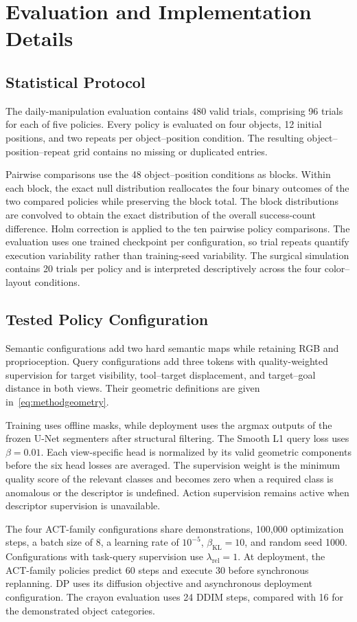 \section{Evaluation and Implementation Details}
\label{app:evalaudit}

\subsection{Statistical Protocol}
The daily-manipulation evaluation contains 480 valid trials, comprising 96 trials for each of five policies.
Every policy is evaluated on four objects, 12 initial positions, and two repeats per object--position condition.
The resulting object--position--repeat grid contains no missing or duplicated entries.

Pairwise comparisons use the 48 object--position conditions as blocks.
Within each block, the exact null distribution reallocates the four binary outcomes of the two compared policies while preserving the block total.
The block distributions are convolved to obtain the exact distribution of the overall success-count difference.
Holm correction is applied to the ten pairwise policy comparisons.
The evaluation uses one trained checkpoint per configuration, so trial repeats quantify execution variability rather than training-seed variability.
The surgical simulation contains 20 trials per policy and is interpreted descriptively across the four color--layout conditions.

\subsection{Tested Policy Configuration}
\label{app:testedimplementation}
Semantic configurations add two hard semantic maps while retaining RGB and proprioception.
Query configurations add three tokens with quality-weighted supervision for target visibility, tool--target displacement, and target--goal distance in both views.
Their geometric definitions are given in~\eqref{eq:methodgeometry}.

Training uses offline masks, while deployment uses the argmax outputs of the frozen U-Net segmenters after structural filtering.
The Smooth L1 query loss uses $\beta=0.01$.
Each view-specific head is normalized by its valid geometric components before the six head losses are averaged.
The supervision weight is the minimum quality score of the relevant classes and becomes zero when a required class is anomalous or the descriptor is undefined.
Action supervision remains active when descriptor supervision is unavailable.

The four ACT-family configurations share demonstrations, 100,000 optimization steps, a batch size of 8, a learning rate of $10^{-5}$, $\beta_{\mathrm{KL}}=10$, and random seed 1000.
Configurations with task-query supervision use $\lambda_{\mathrm{rel}}=1$.
At deployment, the ACT-family policies predict 60 steps and execute 30 before synchronous replanning.
DP uses its diffusion objective and asynchronous deployment configuration.
The crayon evaluation uses 24 DDIM steps, compared with 16 for the demonstrated object categories.
